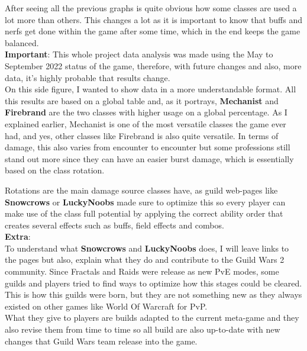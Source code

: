 \documentclass[12pt,a4paper]{article}
\begin{document}
    After seeing all the previous graphs is quite obvious how some classes are used a lot more than others.
    This changes a lot as it is important to know that buffs and nerfs get done within the game after some 
    time, which in the end keeps the game balanced.\\

    \textbf{Important}: This whole project data analysis was made using the May to September 2022 status of
    the game, therefore, with future changes and also, more data, it's highly probable that results change.\\

    On this side figure, I wanted to show data in a more understandable format. All this results are based on
    a global table and, as it portrays, \textbf{Mechanist} and  \textbf{Firebrand} are the two classes with 
    higher usage on a global percentage. As I explained earlier, Mechanist is one of the most versatile classes
    the game ever had, and yes, other classes like Firebrand is also quite versatile. In terms of damage, this
    also varies from encounter to encounter but some professions still stand out more since they can have an 
    easier burst damage, which is essentially based on the class rotation.

    \newpage

    Rotations are the main damage source classes have, as guild web-pages like \textbf{Snowcrows} or \textbf{LuckyNoobs} made sure to
    optimize this so every player can make use of the class full potential by applying the correct ability order
    that creates several effects such as buffs, field effects and combos.\\

    \textbf{Extra}:\\
    To understand what \textbf{Snowcrows} and \textbf{LuckyNoobs} does, I will leave links to the pages but also, explain what they
    do and contribute to the Guild Wars 2 community. Since Fractals and Raids were release as new PvE modes, some 
    guilds and players tried to find ways to optimize how this stages could be cleared. This is how this guilds 
    were born, but they are not something new as they always existed on other games like World Of Warcraft for PvP.\\

    What they give to players are builds adapted to the current meta-game and they also revise them from time to time
    so all build are also up-to-date with new changes that Guild Wars team release into the game.
\end{document}
